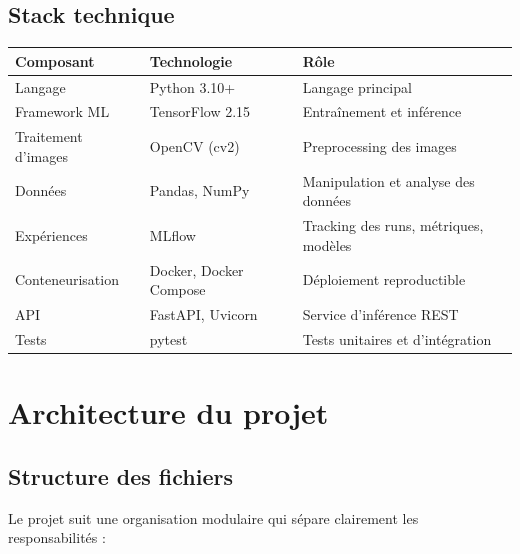 \documentclass[11pt,a4paper]{article}
\begin{document}
\subsection{Stack technique}

\begin{center}
\renewcommand{\arraystretch}{1.3}
\begin{tabular}{lll}
\toprule
\textbf{Composant} & \textbf{Technologie} & \textbf{Rôle} \\
\midrule
Langage & Python 3.10+ & Langage principal \\
Framework ML & TensorFlow 2.15 & Entraînement et inférence \\
Traitement d'images & OpenCV (cv2) & Preprocessing des images \\
Données & Pandas, NumPy & Manipulation et analyse des données \\
Expériences & MLflow & Tracking des runs, métriques, modèles \\
Conteneurisation & Docker, Docker Compose & Déploiement reproductible \\
API & FastAPI, Uvicorn & Service d'inférence REST \\
Tests & pytest & Tests unitaires et d'intégration \\
\bottomrule
\end{tabular}
\end{center}

\section{Architecture du projet}

\subsection{Structure des fichiers}

Le projet suit une organisation modulaire qui sépare clairement les responsabilités :
\end{document}
